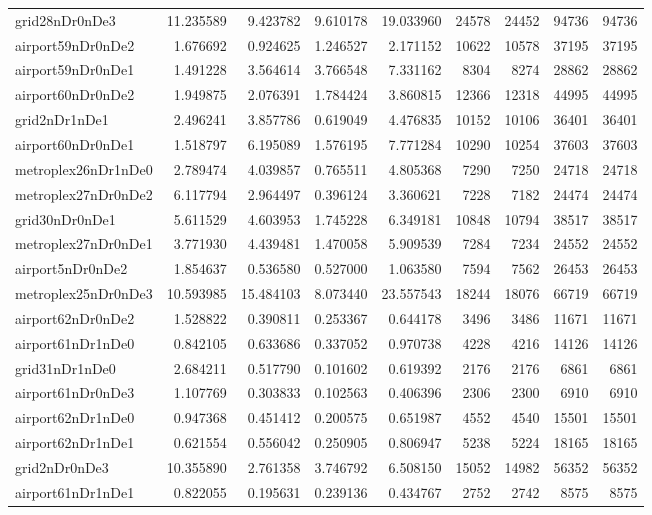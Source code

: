 \begin{longtable}{|l|r|r|r|r|r|r|r|r|}
grid28nDr0nDe3 & 11.235589 & 9.423782 & 9.610178 & 19.033960 & 24578 & 24452 & 94736 & 94736 \\
airport59nDr0nDe2 & 1.676692 & 0.924625 & 1.246527 & 2.171152 & 10622 & 10578 & 37195 & 37195 \\
airport59nDr0nDe1 & 1.491228 & 3.564614 & 3.766548 & 7.331162 & 8304 & 8274 & 28862 & 28862 \\
airport60nDr0nDe2 & 1.949875 & 2.076391 & 1.784424 & 3.860815 & 12366 & 12318 & 44995 & 44995 \\
grid2nDr1nDe1 & 2.496241 & 3.857786 & 0.619049 & 4.476835 & 10152 & 10106 & 36401 & 36401 \\
airport60nDr0nDe1 & 1.518797 & 6.195089 & 1.576195 & 7.771284 & 10290 & 10254 & 37603 & 37603 \\
metroplex26nDr1nDe0 & 2.789474 & 4.039857 & 0.765511 & 4.805368 & 7290 & 7250 & 24718 & 24718 \\
metroplex27nDr0nDe2 & 6.117794 & 2.964497 & 0.396124 & 3.360621 & 7228 & 7182 & 24474 & 24474 \\
grid30nDr0nDe1 & 5.611529 & 4.603953 & 1.745228 & 6.349181 & 10848 & 10794 & 38517 & 38517 \\
metroplex27nDr0nDe1 & 3.771930 & 4.439481 & 1.470058 & 5.909539 & 7284 & 7234 & 24552 & 24552 \\
airport5nDr0nDe2 & 1.854637 & 0.536580 & 0.527000 & 1.063580 & 7594 & 7562 & 26453 & 26453 \\
metroplex25nDr0nDe3 & 10.593985 & 15.484103 & 8.073440 & 23.557543 & 18244 & 18076 & 66719 & 66719 \\
airport62nDr0nDe2 & 1.528822 & 0.390811 & 0.253367 & 0.644178 & 3496 & 3486 & 11671 & 11671 \\
airport61nDr1nDe0 & 0.842105 & 0.633686 & 0.337052 & 0.970738 & 4228 & 4216 & 14126 & 14126 \\
grid31nDr1nDe0 & 2.684211 & 0.517790 & 0.101602 & 0.619392 & 2176 & 2176 & 6861 & 6861 \\
airport61nDr0nDe3 & 1.107769 & 0.303833 & 0.102563 & 0.406396 & 2306 & 2300 & 6910 & 6910 \\
airport62nDr1nDe0 & 0.947368 & 0.451412 & 0.200575 & 0.651987 & 4552 & 4540 & 15501 & 15501 \\
airport62nDr1nDe1 & 0.621554 & 0.556042 & 0.250905 & 0.806947 & 5238 & 5224 & 18165 & 18165 \\
grid2nDr0nDe3 & 10.355890 & 2.761358 & 3.746792 & 6.508150 & 15052 & 14982 & 56352 & 56352 \\
airport61nDr1nDe1 & 0.822055 & 0.195631 & 0.239136 & 0.434767 & 2752 & 2742 & 8575 & 8575 \\

\end{longtable}
